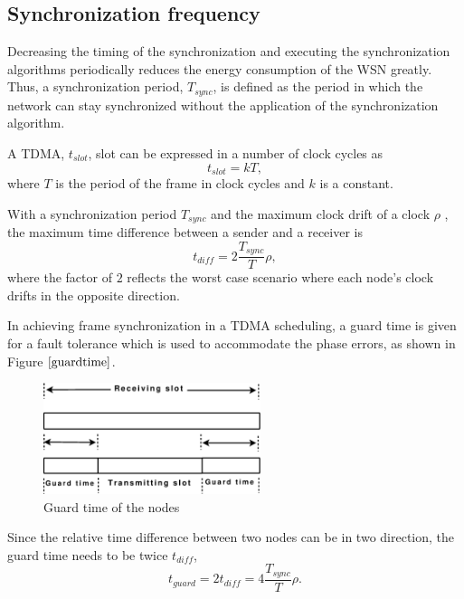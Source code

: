 \documentclass[journal]{IEEEtran}
\begin{document}
\subsection{\textbf{Synchronization frequency}}
Decreasing the timing of the synchronization and executing the synchronization algorithms periodically reduces
the energy consumption of the WSN greatly. Thus, a synchronization period, $T_{sync}$, is defined as the period in which the network can stay synchronized without the application of the synchronization algorithm.
\par A TDMA, $t_{slot}$, slot can be expressed in a
number of clock cycles as
\begin{equation}
t_{slot} = kT ,
\end{equation} where $T$ is the period of the frame in clock cycles and $k$ is a constant.
\par With a synchronization period $T_{sync}$ and the
maximum clock drift of a clock $\rho$ , the maximum time difference
between a sender and a receiver is
\begin{equation}
t_{diff} = 2\frac{T_{sync}}{T}\rho ,
\end{equation}
where the factor of $2$ reflects the worst case scenario where each
node's clock drifts in the opposite direction.\par
In achieving frame synchronization in a TDMA scheduling, a guard time is given for a fault tolerance which is used to accommodate the
phase errors, as shown in Figure $\ref{guardtime}$.
\begin{figure}[t]
\centering
\includegraphics[width=2.5in]{guardtime}
\caption{Guard time of the nodes} \label{guardtime}
\end{figure}
Since the relative time difference between two nodes can be in two direction, the guard time needs to be twice $t_{diff}$,
\begin{equation}
t_{guard}= 2t_{diff} = 4\frac{T_{sync}}{T}\rho.
\end{equation}
\end{document}
